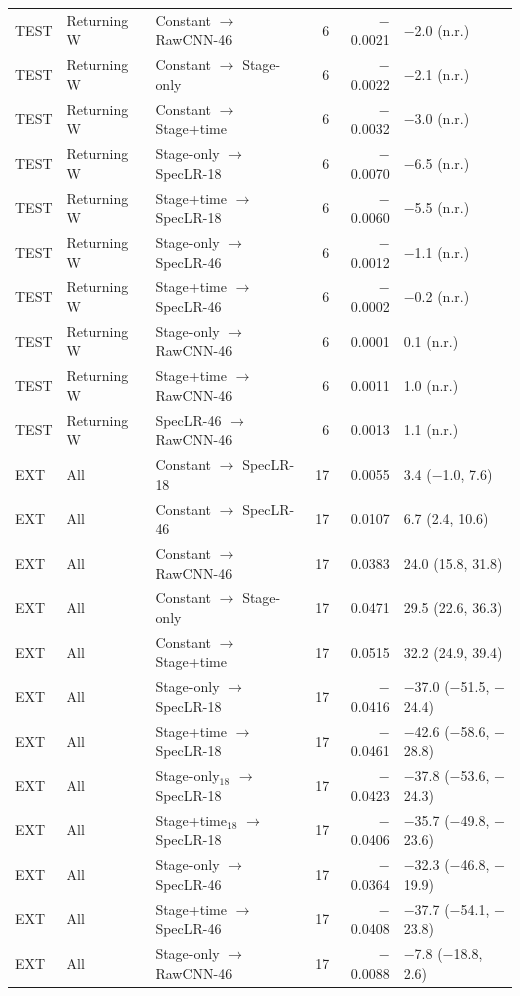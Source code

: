 {{\begin{longtable}{@{}lllrrl@{}}
TEST & Returning W & Constant $\to$ RawCNN-46 & 6 & $-$0.0021 & $-$2.0 (n.r.) \\
TEST & Returning W & Constant $\to$ Stage-only & 6 & $-$0.0022 & $-$2.1 (n.r.) \\
TEST & Returning W & Constant $\to$ Stage+time & 6 & $-$0.0032 & $-$3.0 (n.r.) \\
TEST & Returning W & Stage-only $\to$ SpecLR-18 & 6 & $-$0.0070 & $-$6.5 (n.r.) \\
TEST & Returning W & Stage+time $\to$ SpecLR-18 & 6 & $-$0.0060 & $-$5.5 (n.r.) \\
TEST & Returning W & Stage-only $\to$ SpecLR-46 & 6 & $-$0.0012 & $-$1.1 (n.r.) \\
TEST & Returning W & Stage+time $\to$ SpecLR-46 & 6 & $-$0.0002 & $-$0.2 (n.r.) \\
TEST & Returning W & Stage-only $\to$ RawCNN-46 & 6 & 0.0001 & 0.1 (n.r.) \\
TEST & Returning W & Stage+time $\to$ RawCNN-46 & 6 & 0.0011 & 1.0 (n.r.) \\
TEST & Returning W & SpecLR-46 $\to$ RawCNN-46 & 6 & 0.0013 & 1.1 (n.r.) \\
\addlinespace[1pt]
EXT & All & Constant $\to$ SpecLR-18 & 17 & 0.0055 & 3.4 ($-$1.0, 7.6) \\
EXT & All & Constant $\to$ SpecLR-46 & 17 & 0.0107 & 6.7 (2.4, 10.6) \\
EXT & All & Constant $\to$ RawCNN-46 & 17 & 0.0383 & 24.0 (15.8, 31.8) \\
EXT & All & Constant $\to$ Stage-only & 17 & 0.0471 & 29.5 (22.6, 36.3) \\
EXT & All & Constant $\to$ Stage+time & 17 & 0.0515 & 32.2 (24.9, 39.4) \\
EXT & All & Stage-only $\to$ SpecLR-18 & 17 & $-$0.0416 & $-$37.0 ($-$51.5, $-$24.4) \\
EXT & All & Stage+time $\to$ SpecLR-18 & 17 & $-$0.0461 & $-$42.6 ($-$58.6, $-$28.8) \\
EXT & All & Stage-only$_{18}$ $\to$ SpecLR-18 & 17 & $-$0.0423 & $-$37.8 ($-$53.6, $-$24.3) \\
EXT & All & Stage+time$_{18}$ $\to$ SpecLR-18 & 17 & $-$0.0406 & $-$35.7 ($-$49.8, $-$23.6) \\
EXT & All & Stage-only $\to$ SpecLR-46 & 17 & $-$0.0364 & $-$32.3 ($-$46.8, $-$19.9) \\
EXT & All & Stage+time $\to$ SpecLR-46 & 17 & $-$0.0408 & $-$37.7 ($-$54.1, $-$23.8) \\
EXT & All & Stage-only $\to$ RawCNN-46 & 17 & $-$0.0088 & $-$7.8 ($-$18.8, 2.6) \\

\end{longtable}}}
